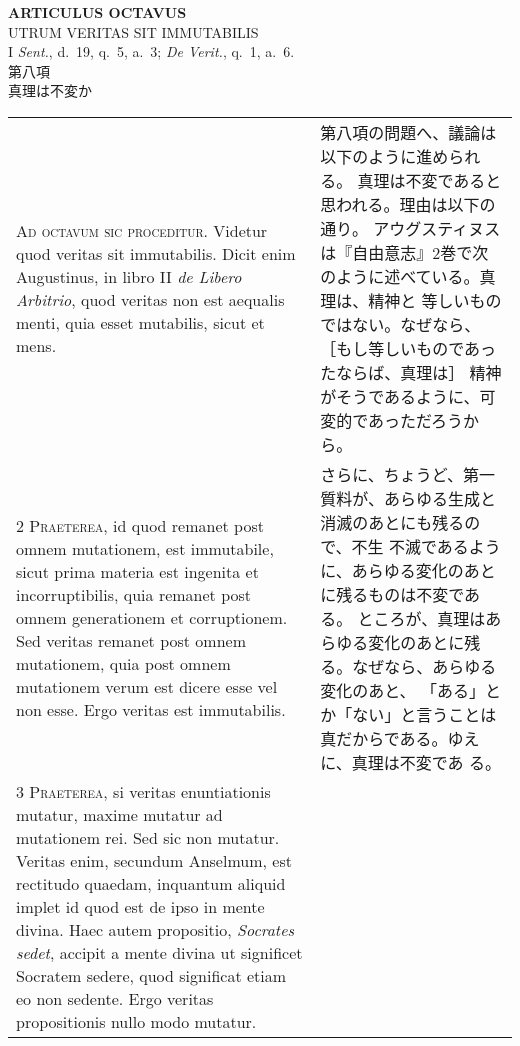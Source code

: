 \documentclass[10pt]{jsarticle} %
\begin{document}
\begin{center}
 {\Large {\bf ARTICULUS OCTAVUS}}\\
 {\large UTRUM VERITAS SIT IMMUTABILIS}\\
 {\footnotesize I {\itshape Sent.}, d.~19, q.~5, a.~3; {\itshape De
 Verit.}, q.~1, a.~6.}\\
 {\Large 第八項\\真理は不変か}
\end{center}

\begin{longtable}{p{21em}p{21em}}

{\huge A}{\scshape d octavum sic proceditur}. Videtur
quod veritas sit immutabilis. Dicit enim Augustinus, in libro II {\itshape de
Libero Arbitrio}, quod veritas non est aequalis menti, quia esset
mutabilis, sicut et mens.

&

第八項の問題へ、議論は以下のように進められる。
真理は不変であると思われる。理由は以下の通り。
アウグスティヌスは『自由意志』2巻で次のように述べている。真理は、精神と
 等しいものではない。なぜなら、［もし等しいものであったならば、真理は］
 精神がそうであるように、可変的であっただろうから。


\\


{\scshape 2 Praeterea}, id quod remanet post
omnem mutationem, est immutabile, sicut prima materia est ingenita et
incorruptibilis, quia remanet post omnem generationem et
corruptionem. Sed veritas remanet post omnem mutationem, quia post omnem
mutationem verum est dicere esse vel non esse. Ergo veritas est
immutabilis.

&

さらに、ちょうど、第一質料が、あらゆる生成と消滅のあとにも残るので、不生
不滅であるように、あらゆる変化のあとに残るものは不変である。
ところが、真理はあらゆる変化のあとに残る。なぜなら、あらゆる変化のあと、
 「ある」とか「ない」と言うことは真だからである。ゆえに、真理は不変であ
 る。

\\


{\scshape 3 Praeterea}, si veritas
enuntiationis mutatur, maxime mutatur ad mutationem rei. Sed sic non
mutatur. Veritas enim, secundum Anselmum, est rectitudo quaedam,
inquantum aliquid implet id quod est de ipso in mente divina. Haec autem
propositio, {\itshape Socrates sedet}, accipit a mente divina ut significet
Socratem sedere, quod significat etiam eo non sedente. Ergo veritas
propositionis nullo modo mutatur.


\end{longtable}
\end{document}
